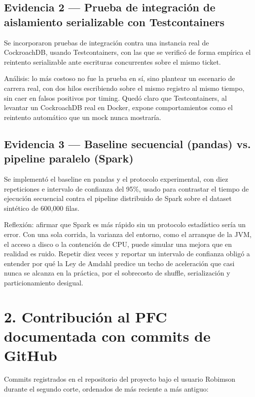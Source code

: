 \documentclass[12pt]{article}
\begin{document}
\subsection*{Evidencia 2 --- Prueba de integración de aislamiento serializable con Testcontainers}
Se incorporaron pruebas de integración contra una instancia real de CockroachDB, usando Testcontainers, con las que se verificó de forma empírica el reintento serializable ante escrituras concurrentes sobre el mismo ticket.

Análisis: lo más costoso no fue la prueba en sí, sino plantear un escenario de carrera real, con dos hilos escribiendo sobre el mismo registro al mismo tiempo, sin caer en falsos positivos por timing. Quedó claro que Testcontainers, al levantar un CockroachDB real en Docker, expone comportamientos como el reintento automático que un mock nunca mostraría.

\subsection*{Evidencia 3 --- Baseline secuencial (pandas) vs. pipeline paralelo (Spark)}
Se implementó el baseline en pandas y el protocolo experimental, con diez repeticiones e intervalo de confianza del 95\%, usado para contrastar el tiempo de ejecución secuencial contra el pipeline distribuido de Spark sobre el dataset sintético de 600{,}000 filas.

Reflexión: afirmar que Spark es más rápido sin un protocolo estadístico sería un error. Con una sola corrida, la varianza del entorno, como el arranque de la JVM, el acceso a disco o la contención de CPU, puede simular una mejora que en realidad es ruido. Repetir diez veces y reportar un intervalo de confianza obligó a entender por qué la Ley de Amdahl predice un techo de aceleración que casi nunca se alcanza en la práctica, por el sobrecosto de shuffle, serialización y particionamiento desigual.

\section*{2. Contribución al PFC documentada con commits de GitHub}

Commits registrados en el repositorio del proyecto bajo el usuario Robimson durante el segundo corte, ordenados de más reciente a más antiguo:
\end{document}
